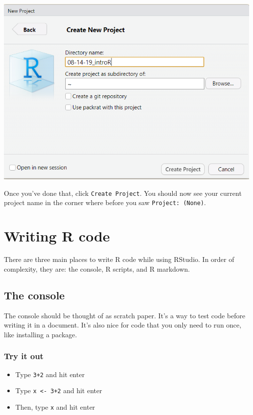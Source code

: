 \documentclass[]{book}
\begin{document}
\includegraphics[width=9.26in]{images/03-02-newproject}

Once you've done that, click \texttt{Create\ Project}. You should now
see your current project name in the corner where before you saw
\texttt{Project:\ (None)}.

\chapter{Writing R code}\label{writing-r-code}

There are three main places to write R code while using RStudio. In
order of complexity, they are: the console, R scripts, and R markdown.

\section{The console}\label{the-console}

The console should be thought of as scratch paper. It's a way to test
code before writing it in a document. It's also nice for code that you
only need to run once, like installing a package.

\subsection{Try it out}\label{try-it-out}

\begin{itemize}
\item
  Type \texttt{3+2} and hit enter
\item
  Type \texttt{x\ \textless{}-\ 3+2} and hit enter
\item
  Then, type \texttt{x} and hit enter
\end{itemize}
\end{document}
